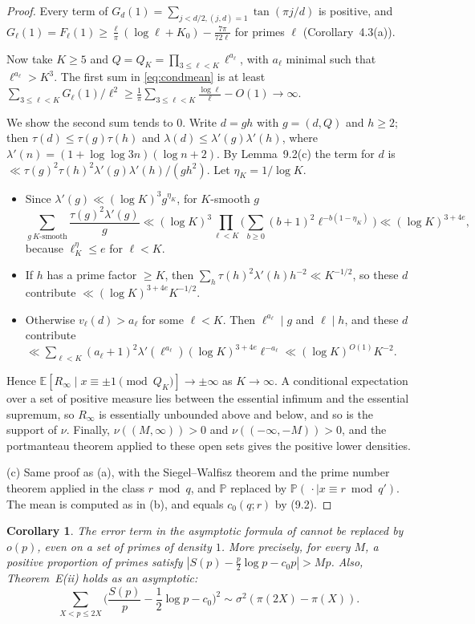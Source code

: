 \documentclass[11pt]{amsart}
\newtheorem{corollary}[lemma]{Corollary}
\theoremstyle{remark}
\newcommand{\E}{\mathbb{E}}
\newcommand{\Prob}{\mathbb{P}}
\begin{document}
\begin{proof}
Every term of $G_d(1)=\sum_{j<d/2,(j,d)=1}\tan(\pi j/d)$ is positive, and $G_\ell(1)=F_\ell(1)\ge\frac\ell\pi(\log\ell+K_0)-\frac{7\pi}{72\ell}$ for primes $\ell$ (Corollary~4.3(a)).

Now take $K\ge5$ and $Q=Q_K=\prod_{3\le\ell<K}\ell^{a_\ell}$, with $a_\ell$ minimal such that $\ell^{a_\ell}>K^3$. The first sum in \eqref{eq:condmean} is at least $\sum_{3\le\ell<K}G_\ell(1)/\ell^2\ge\frac1\pi\sum_{3\le\ell<K}\frac{\log\ell}{\ell}-O(1)\to\infty$.

We show the second sum tends to $0$. Write $d=gh$ with $g=(d,Q)$ and $h\ge2$; then $\tau(d)\le\tau(g)\tau(h)$ and $\lambda(d)\le\lambda'(g)\lambda'(h)$, where $\lambda'(n)=(1+\log\log3n)(\log n+2)$. By Lemma~9.2(c) the term for $d$ is $\ll\tau(g)^2\tau(h)^2\lambda'(g)\lambda'(h)/(gh^2)$. Let $\eta_K=1/\log K$.
\begin{itemize}
\item Since $\lambda'(g)\ll(\log K)^3g^{\eta_K}$, for $K$-smooth $g$
\[
\sum_{g\ K\text{-smooth}}\frac{\tau(g)^2\lambda'(g)}g\ll(\log K)^3\prod_{\ell<K}\Big(\sum_{b\ge0}(b+1)^2\ell^{-b(1-\eta_K)}\Big)\ll(\log K)^{3+4e},
\]
because $\ell^\eta_K\le e$ for $\ell<K$.
\item If $h$ has a prime factor $\ge K$, then $\sum_h\tau(h)^2\lambda'(h)h^{-2}\ll K^{-1/2}$, so these $d$ contribute $\ll(\log K)^{3+4e}K^{-1/2}$.
\item Otherwise $v_\ell(d)>a_\ell$ for some $\ell<K$. Then $\ell^{a_\ell}\mid g$ and $\ell\mid h$, and these $d$ contribute $\ll\sum_{\ell<K}(a_\ell+1)^2\lambda'(\ell^{a_\ell})(\log K)^{3+4e}\ell^{-a_\ell}\ll(\log K)^{O(1)}K^{-2}$.
\end{itemize}
Hence $\E[R_\infty\mid x\equiv\pm1\pmod{Q_K}]\to\pm\infty$ as $K\to\infty$. A conditional expectation over a set of positive measure lies between the essential infimum and the essential supremum, so $R_\infty$ is essentially unbounded above and below, and so is the support of $\nu$. Finally, $\nu((M,\infty))>0$ and $\nu((-\infty,-M))>0$, and the portmanteau theorem applied to these open sets gives the positive lower densities.

(c) Same proof as (a), with the Siegel--Walfisz theorem and the prime number theorem applied in the class $r\bmod q$, and $\Prob$ replaced by $\Prob(\,\cdot\mid x\equiv r\bmod q')$. The mean is computed as in (b), and equals $c_0(q;r)$ by (9.2).
\end{proof}

\begin{corollary}
The error term in the asymptotic formula of \cite[Theorem~C]{TS} cannot be replaced by $o(p)$, even on a set of primes of density $1$. More precisely, for every $M$, a positive proportion of primes satisfy $|S(p)-\frac p2\log p-c_0p|>Mp$. Also, Theorem~E(ii) holds as an asymptotic:
\[
\sum_{X<p\le2X}\Big(\frac{S(p)}p-\frac12\log p-c_0\Big)^2\sim\sigma^2(\pi(2X)-\pi(X)).
\]
\end{corollary}
\end{document}
